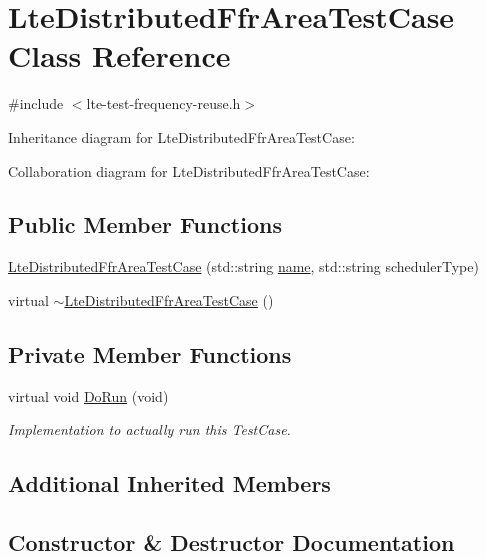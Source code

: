 \hypertarget{classLteDistributedFfrAreaTestCase}{}\section{Lte\+Distributed\+Ffr\+Area\+Test\+Case Class Reference}
\label{classLteDistributedFfrAreaTestCase}


{\ttfamily \#include $<$lte-\/test-\/frequency-\/reuse.\+h$>$}



Inheritance diagram for Lte\+Distributed\+Ffr\+Area\+Test\+Case\+:


Collaboration diagram for Lte\+Distributed\+Ffr\+Area\+Test\+Case\+:
\subsection*{Public Member Functions}
\begin{DoxyCompactItemize}
\item 
\hyperlink{classLteDistributedFfrAreaTestCase_a82928eaa9c2bf43c4b1e19ef66a019bb}{Lte\+Distributed\+Ffr\+Area\+Test\+Case} (std\+::string \hyperlink{generate__test__data__lte__spectrum__model_8m_ab74e6bf80237ddc4109968cedc58c151}{name}, std\+::string scheduler\+Type)
\item 
virtual \hyperlink{classLteDistributedFfrAreaTestCase_a689440c6ccd0b7751e5c94c9087939ef}{$\sim$\+Lte\+Distributed\+Ffr\+Area\+Test\+Case} ()
\end{DoxyCompactItemize}
\subsection*{Private Member Functions}
\begin{DoxyCompactItemize}
\item 
virtual void \hyperlink{classLteDistributedFfrAreaTestCase_a1a386a39f2ddc3d22b17a134b775e2b7}{Do\+Run} (void)
\begin{DoxyCompactList}\small\item\em Implementation to actually run this Test\+Case. \end{DoxyCompactList}\end{DoxyCompactItemize}
\subsection*{Additional Inherited Members}


\subsection{Constructor \& Destructor Documentation}
